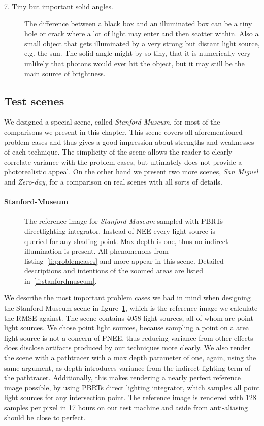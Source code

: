 \begin{description}
    \item[7. Tiny but important solid angles.] The difference between a black box and an illuminated box can be a tiny hole or crack where a lot of light may enter and then scatter within. Also a small object that gets illuminated by a very strong but distant light source, e.g. the sun. The solid angle might by so tiny, that it is numerically very unlikely that photons would ever hit the object, but it may still be the main source of brightness.
\label{li:problemcases}
\end{description} 

\subsection{Test scenes}

We designed a special scene, called \textit{Stanford-Museum}, for most of the comparisons we present in this chapter. This scene covers all aforementioned problem cases and thus gives a good impression about strengths and weaknesses of each technique. The simplicity of the scene allows the reader to clearly correlate variance with the problem cases, but ultimately does not provide a photorealistic appeal. On the other hand we present two more scenes, \textit{San Miguel} and \textit{Zero-day}, for a comparison on real scenes with all sorts of details.

\paragraph{Stanford-Museum}

\begin{figure}[ht]\centering

\caption{The reference image for \textit{Stanford-Museum} sampled with PBRTs directlighting integrator. Instead of NEE every light source is queried for any shading point. Max depth is one, thus no indirect illumination is present. All phenomenons from listing~\ref{li:problemcases} and more appear in this scene. Detailed descriptions and intentions of the zoomed areas are listed in~\ref{li:stanfordmuseum}.
}
\label{fig:stanfordmuseumref}
\end{figure}

We describe the most important problem cases we had in mind when designing the Stanford-Museum scene in figure~\ref{fig:stanfordmuseumref}, which is the reference image we calculate the RMSE against. The scene contains 4058 light sources, all of whom are point light sources. We chose point light sources, because sampling a point on a area light source is not a concern of PNEE, thus reducing variance from other effects does disclose artifacts produced by our techniques more clearly. We also render the scene with a pathtracer with a max depth parameter of one, again, using the same argument, as depth introduces variance from the indirect lighting term of the pathtracer. Additionally, this makes rendering a nearly perfect reference image possible, by using PBRTs direct lighting integrator, which samples all point light sources for any intersection point. The reference image is rendered with 128 samples per pixel in 17 hours on our test machine and aside from anti-aliasing should be close to perfect. 

